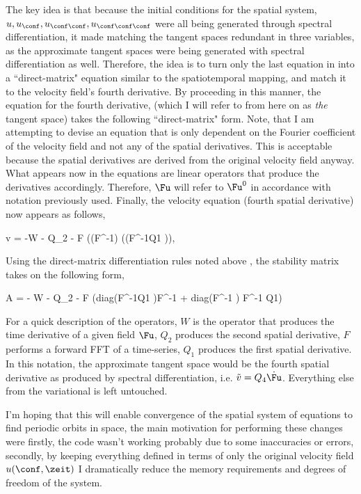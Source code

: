 The key idea is that because the initial conditions for the spatial system,
$u, u_{\conf}, u_{\conf \conf}, u_{\conf \conf \conf}$ were all being generated
through spectral differentiation, it made matching the tangent spaces redundant in
three variables, as the approximate tangent spaces were being generated with spectral
differentiation as well. Therefore, the idea is to turn only the last equation in
 into a ``direct-matrix"  equation similar to the spatiotemporal mapping,
and match it to the velocity field's fourth derivative.
By proceeding in this manner, the equation for the fourth derivative, (which I will
refer to from here on as \emph{the} tangent space) takes the following ``direct-matrix" form.
Note, that I am attempting to devise an equation that is only dependent on the Fourier coefficient of the
velocity field and not any of the spatial derivatives. This is acceptable because the spatial derivatives
are derived from the original velocity field anyway. What appears now in the equations are linear operators
that produce the derivatives accordingly. Therefore, $\Fu$ will refer to $\Fu^{0}$ in accordance with
notation previously used. Finally, the velocity equation (fourth spatial derivative) now appears as follows,

\beq \label{e-FksXdirectmatrix}
v = -W \dot \Fu - Q_2 \dot \Fu - F \dot ((F^{-1}\dot \Fu) \star ((F^{-1}\dot Q1 \Fu)),
\eeq

Using the direct-matrix differentiation rules noted above , the stability matrix takes on the following form,

\beq \label{e-FksXdirectStbMat}
A = - W - Q_2 - F \dot (diag(F^{-1}\dot Q1 \dot \Fu)\dot F^{-1} + diag(F^{-1} \dot \Fu) \dot F^{-1} \dot Q1)
\eeq

For a quick description of the operators, $W$ is the operator that produces the time derivative of a given field
$\Fu$, $Q_2$ produces the second spatial derivative, $F$ performs a forward FFT of a time-series, $Q_1$ produces
the first spatial derivative. In this notation, the approximate tangent space would be the fourth spatial derivative
as produced by spectral differentiation, i.e. $\tilde{v} = Q_4 \dot \Fu$. Everything else from the variational
{\descent} is left untouched.

I'm hoping that this will enable convergence of the spatial system of equations to find periodic orbits in space, the
main motivation for performing these changes were firstly, the code wasn't working probably due to some inaccuracies or errors,
secondly, by keeping
everything defined in terms of only the original velocity field $u(\conf, \zeit)$ I dramatically reduce the memory
requirements and degrees of freedom of the system.

